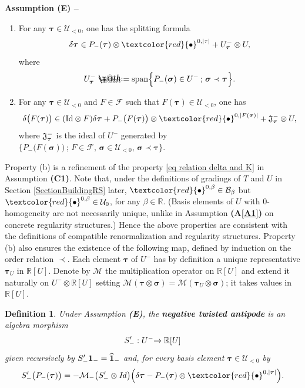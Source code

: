 \documentclass[10pt, reqno]{amsart}
\makeatletter
\numberwithin{subsection}{section}
\numberwithin{subsubsection}{subsection}
\numberwithin{equation}{section} %
\theoremstyle{mystyle}
\theoremstyle{mystyle2}
\newtheorem*{defn*} {Definition}
\theoremstyle{mystyle3}
\newcommand{\refA}[1]{\textbf{\textsf{(A\ref{#1})}}}
\newcommand{\mcF}{\boldsymbol{p}}
\newcommand{\bstau}{\boldsymbol{\tau}}
\newcommand{\bssigma}{\boldsymbol{\sigma}}
\newcommand\bbR{\mathbb{R}}
\newcommand{\mcB}{\mathcal{B}}
\renewcommand{\mcF}{\mathcal{F}}
\newcommand{\mcM}{\mathcal{M}}
\newcommand\mcU{\mathcal U}
\newcommand*{\defeq}{\mathrel{\rlap{%
                     \raisebox{0.3ex}{$\m@th\cdot$}}%
                     \raisebox{-0.3ex}{$\m@th\cdot$}}%
                     =}
\makeatother
\begin{document}
\noindent \textbf{\textsf{Assumption (E) -- }}{\it 
\begin{enumerate}
\setlength{\itemsep}{0.1cm}

   \item[\emph{\textsf{(a)}}] For any $\bstau\in\mcU_{<0}$, one has the splitting formula
   $$
   \delta\bstau \in P_-(\bstau)\otimes \textcolor{red}{\bullet}^{0,\vert\tau\vert}+U_{\bstau}^-\otimes U,
   $$
   where 
   $$
   U_{\bstau}^- \defeq  \text{\rm span}\Big\{P_-(\bssigma)\in U^-\, ;\, \bssigma\prec\bstau\Big\}.
   $$
   
   \item[\emph{\textsf{(b)}}] For any $\bstau\in\mcU_{<0}$ and $F\in\mcF$ 
such that $F(\bstau)\in\mcU_{<0}$, one has
   $$
   \delta\big(F(\bstau)\big)\in (\text{\rm Id}\otimes F)\delta\bstau + P_-\big(F(\bstau)\big)\otimes\textcolor{red}{\bullet}^{0,\vert F(\bstau)\vert} + \frak{J}_{\bstau}^-\otimes U,
   $$
   where $\frak{J}_{\bstau}^-$ is the ideal of $U^-$ generated by $\Big\{P_-\big(F(\bssigma)\big)\, ;\, F\in\mcF,\, \bssigma\in \mcU_{<0},\, \bssigma\prec\bstau\Big\}$.
   
\end{enumerate} }   

\medskip

Property \textsf{(b)} is a refinement of the property \eqref{eq relation delta and K} in Assumption \textbf{\textsf{(C1)}}. 
Note that, under the definitions of gradings of $T$ and $U$ in Section \ref{SectionBuildingRS} later, $\textcolor{red}{\bullet}^{0,\beta}\in\mcB_\beta$ but $\textcolor{red}{\bullet}^{0,\beta}\in\mcU_0$, for any $\beta\in\bbR$. (Basis elements of $U$ with $0$-homogeneity are not necessarily unique, unlike in Assumption \refA{A1} on concrete regularity structures.) Hence the above properties are consistent with the definitions of compatible renormalization and regularity structures. Property \textsf{(b)} also ensures the existence of the following map, defined by induction on the order relation $\prec$. Each element $\bstau$ of $U^-$ has by definition a unique representative $\bstau_U$ in $\mathbb{R}[U]$. Denote by $\mcM$ the multiplication operator on $\mathbb{R}[U]$ and extend it naturally on $U^-\otimes\mathbb{R}[U]$ setting $\mcM(\bstau\otimes\bssigma)=\mcM(\bstau_U\otimes\bssigma)$; it takes values in $\mathbb{R}[U]$.

\medskip

\begin{defn*}
Under Assumption \textbf{\textsf{(E)}}, the \textbf{\textsf{negative twisted antipode}} is an algebra morphism 
$$
S'_-: U^-\hspace{-0.1cm}\rightarrow\bbR[U]
$$
given recursively by $S_-'{\bf1}_- = \widehat{\bf1}_-$ and, for every basis element $\bstau\in\mcU_{<0}$ by
\begin{equation}   \label{EqCharacterizationTwistedNegativeAntipode}
S'_-\big(P_-(\bstau)\big) = -\mcM_-\big(S'_-\otimes \textrm{\emph{Id}}\big)\Big(\delta\bstau - P_-(\bstau)\otimes\textcolor{red}{\bullet}^{0,\vert\bstau\vert}\Big).
\end{equation}
\end{defn*}
\end{document}
